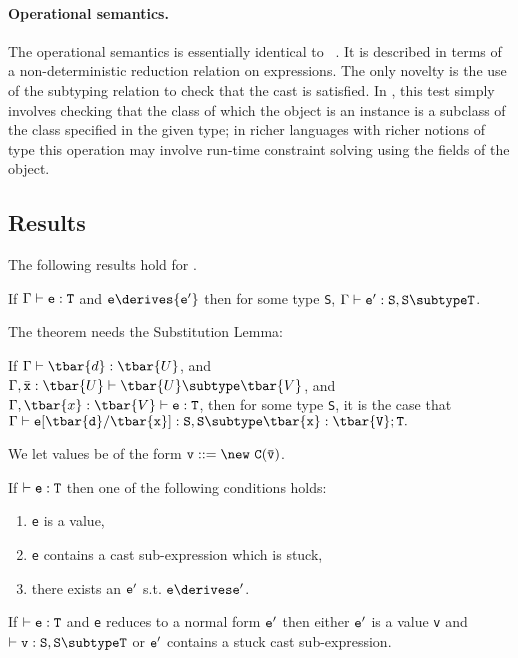 \paragraph{Operational semantics.}

The operational semantics is essentially identical
to \FJ~\cite{FJ}. It is described in terms of a non-deterministic
reduction relation on expressions. The only novelty is the use of the
subtyping relation to check that the cast is satisfied. In \FXZ, this
test simply involves checking that the class of which the object is an
instance is a subclass of the class specified in the given type; in
richer languages with richer notions of type this operation may
involve run-time constraint solving using the fields of the object.


\subsection{Results}
The following results hold for \FXD.

\begin{theorem} If $\Gamma \vdash {\tt e:T}$
and ${\tt e} \derives {\tt e'}$ then for some type {\tt S}, $\Gamma \vdash {\tt e':S},{\tt S \subtype T}$.
\end{theorem}

The theorem needs the Substitution Lemma:
\begin{lemma}
If 
$\Gamma \vdash \tbar{d}:\tbar{U}$, and
$\Gamma, \bar{\tt x}:\tbar{U} \vdash \tbar{U}\subtype\tbar{V}$,
and
$\Gamma, \tbar{x}:\tbar{V} \vdash {\tt e:T}$,
then for some type {\tt S}, it is the case that
$\Gamma \vdash {\tt e[\tbar{d}/\tbar{x}]:S}, {\tt S \subtype
\tbar{x}:\tbar{V};T}.$
\end{lemma}

We let values be of the form $\tt v ::= \new\ C(\bar{\tt v})$. 
\begin{theorem}[Progress]
If $\vdash {\tt e:T}$ then one of the following conditions holds:
\begin{enumerate}
\item {\tt e} is a value,
\item {\tt e} contains a cast sub-expression which is stuck,
\item there exists an $\tt e'$ s.t. $\tt e\derives e'$.
\end{enumerate}
\end{theorem}

\begin{theorem}
If $\vdash {\tt e:T}$ and {\tt e} reduces to a normal form ${\tt e'}$ then
either $\tt e'$ is a value {\tt v} and $\vdash {\tt v:S},{\tt S\subtype T}$ or
${\tt e'}$ contains  a stuck cast sub-expression.
\end{theorem}





